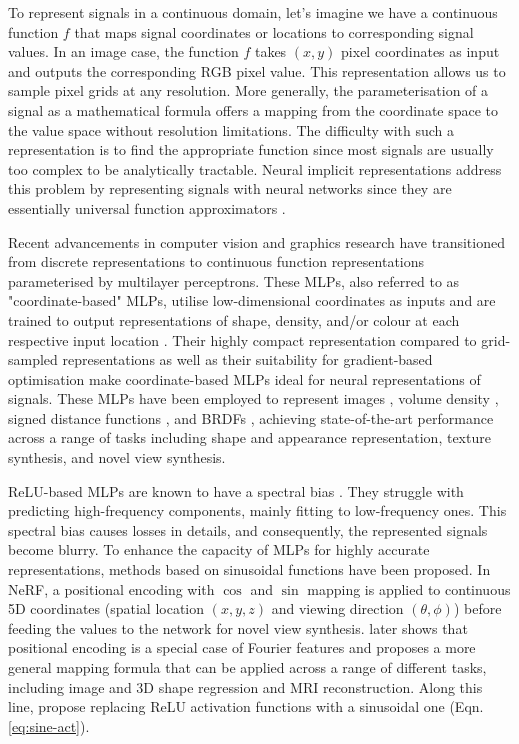 To represent signals in a continuous domain, let's imagine we have a continuous function $f$ that maps signal coordinates or locations to corresponding signal values. In an image case, the function $f$ takes $(x, y)$ pixel coordinates as input and outputs the corresponding RGB pixel value. This representation allows us to sample pixel grids at any resolution. More generally, the parameterisation of a signal as a mathematical formula offers a mapping from the coordinate space to the value space without resolution limitations. The difficulty with such a representation is to find the appropriate function since most signals are usually too complex to be analytically tractable. Neural implicit representations address this problem by representing signals with neural networks since they are essentially universal function approximators \cite{cybenko1989approximation}.

Recent advancements in computer vision and graphics research have transitioned from discrete representations to continuous function representations parameterised by multilayer perceptrons. These \gls{MLP}s, also referred to as "coordinate-based" \gls{MLP}s, utilise low-dimensional coordinates as inputs and are trained to output representations of shape, density, and/or colour at each respective input location \cite{ffn}. Their highly compact representation compared to grid-sampled representations as well as their suitability for gradient-based optimisation make coordinate-based \gls{MLP}s ideal for neural representations of signals. These \gls{MLP}s have been employed to represent images \cite{nguyen2015deep}, volume density \cite{mildenhall2021nerf}, signed distance functions \cite{park2019deepsdf}, and \gls{BRDF}s \cite{sztrajman2021neural}, achieving state-of-the-art performance across a range of tasks including shape and appearance representation, texture synthesis, and novel view synthesis.

\gls{ReLU}-based \gls{MLP}s are known to have a spectral bias \cite{rahaman2019spectral}. They struggle with predicting high-frequency components, mainly fitting to low-frequency ones. This spectral bias causes losses in details, and consequently, the represented signals become blurry. To enhance the capacity of \gls{MLP}s for highly accurate representations, methods based on sinusoidal functions have been proposed. In NeRF, a positional encoding with $\cos$ and $\sin$ mapping is applied to continuous 5D coordinates (spatial location $(x, y, z)$ and viewing direction $(\theta, \phi)$) before feeding the values to the network for novel view synthesis. \citeauthor{ffn} \cite{ffn} later shows that positional encoding is a special case of Fourier features \cite{rahimi2007random} and proposes a more general mapping formula that can be applied across a range of different tasks, including image and 3D shape regression and MRI reconstruction. Along this line, \citeauthor{sitzmann2020siren} \cite{sitzmann2020siren} propose replacing \gls{ReLU} activation functions with a sinusoidal one (Eqn. \ref{eq:sine-act}).

